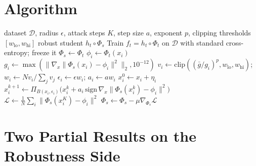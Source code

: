 \appendix

\section{Algorithm}
\label{app:alg}

\begin{algorithm}[h]
\caption{Clean Feature Anchoring (CFA)}
\label{alg:cfa}
\begin{algorithmic}[1]
 dataset $\mathcal{D}$, radius $\epsilon$, attack steps $K$, step size $a$,
  exponent $p$, clipping thresholds $[w_{\mathrm{lo}}, w_{\mathrm{hi}}]$
 robust student $h_t \circ \Phi_s$
\STATE
\STATE {}
\STATE Train $f_t = h_t \circ \Phi_t$ on $\mathcal{D}$ with standard cross-entropy; freeze it
\STATE
\STATE {}
\STATE $\Phi_s \leftarrow \Phi_t$ \hfill {}
    \STATE $\phi_i \leftarrow \Phi_t(x_i)$ \hfill {}
    \STATE $g_i \leftarrow \max(\lVert \nabla_x \lVert \Phi_s(x_i) - \phi_i \rVert^2 \rVert_2,10^{-12})$
      \hfill {}
    \STATE $v_i \leftarrow \mathrm{clip}((\bar g/g_i)^p,w_{\mathrm{lo}},w_{\mathrm{hi}})$;
      $w_i \leftarrow Nv_i/\sum_jv_j$
    \STATE $\epsilon_i \leftarrow \epsilon w_i$; $a_i\leftarrow a w_i$
      \hfill {}
    \STATE $x_i^{0} \leftarrow x_i + \eta_i$
      \STATE $x_i^{k+1} \leftarrow \Pi_{B(x_i, \epsilon_i)}
        \big( x_i^{k} + a_i\,\mathrm{sign}\,\nabla_x \lVert \Phi_s(x_i^{k}) - \phi_i \rVert^2 \big)$
    \ENDFOR
    \STATE $\mathcal{L} \leftarrow \frac{1}{N} \sum_i
      \lVert \Phi_s(x_i^{K}) - \phi_i \rVert^2$
    \STATE $\Phi_s \leftarrow \Phi_s - \mu \nabla_{\Phi_s} \mathcal{L}$
      \hfill {}
  \ENDFOR
\ENDFOR
\end{algorithmic}
\end{algorithm}

\section{Two Partial Results on the Robustness Side}
\label{app:robustness}

